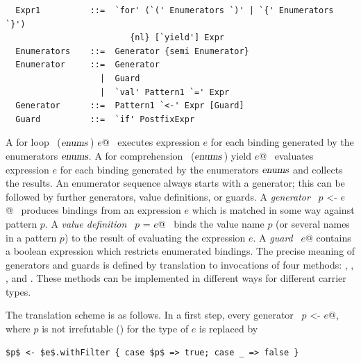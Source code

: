 \syntax\begin{lstlisting}
  Expr1          ::=  `for' (`(' Enumerators `)' | `{' Enumerators `}') 
                         {nl} [`yield'] Expr
  Enumerators    ::=  Generator {semi Enumerator}
  Enumerator     ::=  Generator 
                   |  Guard
                   |  `val' Pattern1 `=' Expr
  Generator      ::=  Pattern1 `<-' Expr [Guard]
  Guard          ::=  `if' PostfixExpr
\end{lstlisting}

A for loop ~\lstinline@for ($\mbox{\sl enums}\,$) $e$@~ executes expression $e$
for each binding generated by the enumerators $\mbox{\sl enums}$.  A for
comprehension ~\lstinline@for ($\mbox{\sl enums}\,$) yield $e$@~ evaluates
expression $e$ for each binding generated by the enumerators $\mbox{\sl enums}$
and collects the results. An enumerator sequence always starts with a
generator; this can be followed by further generators, value
definitions, or guards.  A {\em generator} ~\lstinline@$p$ <- $e$@~
produces bindings from an expression $e$ which is matched in some way
against pattern $p$. A {\em value definition} ~\lstinline@$p$ = $e$@~ 
binds the value name $p$ (or several names in a pattern $p$) to
the result of evaluating the expression $e$.  A {\em guard}
~\lstinline@if $e$@ contains a boolean expression which restricts
enumerated bindings. The precise meaning of generators and guards is
defined by translation to invocations of four methods: ,
, , and . These methods can
be implemented in different ways for different carrier types.

The translation scheme is as follows.  In a first step, every
generator ~\lstinline@$p$ <- $e$@, where $p$ is not irrefutable ()
for the type of $e$ is replaced by
\begin{lstlisting}
$p$ <- $e$.withFilter { case $p$ => true; case _ => false }
\end{lstlisting}

